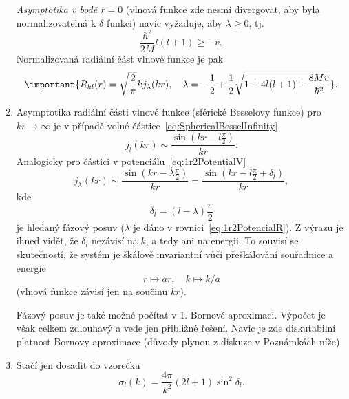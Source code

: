 \begin{solution}
\begin{enumerate}
		\emph{Asymptotika v bodě $r=0$} (vlnová funkce zde nesmí divergovat, aby byla normalizovatelná k $\delta$ funkci) navíc vyžaduje, aby $\lambda\geq0$, tj.
		\begin{equation}
			\frac{\hbar^{2}}{2M}l(l+1)\geq-v,
		\end{equation}        
		Normalizovaná radiální část vlnové funkce je pak
		\begin{equation}\label{eq:1r2PotencialR}
			\important{
				R_{kl}(r)=\sqrt{\frac{2}{\pi}}kj_{\lambda}(kr),\quad\lambda=-\frac{1}{2}+\frac{1}{2}\sqrt{1+4l(l+1)+\frac{8Mv}{\hbar^{2}}}
			}.
		\end{equation}

	\item
		Asymptotika radiální části vlnové funkce (sférické Besselovy funkce) pro $kr\rightarrow\infty$ je v případě volné částice~\eqref{eq:SphericalBesselInfinity}
		\begin{equation}
			j_{l}(kr)\sim\frac{\sin\left(kr-l\frac{\pi}{2}\right)}{kr}.
		\end{equation}
		Analogicky pro částici v potenciálu~\eqref{eq:1r2PotentialV}
		\begin{equation}
			j_{\lambda}(kr)
				\sim\frac{\sin\left(kr-\lambda\frac{\pi}{2}\right)}{kr}
				=\frac{\sin\left(kr-l\frac{\pi}{2}+\delta_{l}\right)}{kr},
		\end{equation}
		kde
		\begin{equation}
			\delta_{l}=(l-\lambda)\frac{\pi}{2}
		\end{equation}
		je hledaný fázový posuv ($\lambda$ je dáno v rovnici~\eqref{eq:1r2PotencialR}).
		Z výrazu je ihned vidět, že $\delta_l$ nezávisí na $k$, a tedy ani na energii.
		To souvisí se skutečností, že systém je škálově invariantní vůči přeškálování souřadnice a energie
		\begin{equation}
			r\mapsto ar, \quad k\mapsto k/a
		\end{equation}
		(vlnová funkce závisí jen na součinu $kr$).

		Fázový posuv je také možné počítat v 1. Bornově aproximaci.
		Výpočet je však celkem zdlouhavý a vede jen přibližné řešení.  
		Navíc je zde diskutabilní platnost Bornovy aproximace (důvody plynou z diskuze v Poznámkách níže).

	\item
		Stačí jen dosadit do vzorečku
		\begin{equation}
			\sigma_{l}(k)=\frac{4\pi}{k^{2}}(2l+1)\sin^{2}\delta_l.
		\end{equation}
\end{enumerate}
\end{solution}

